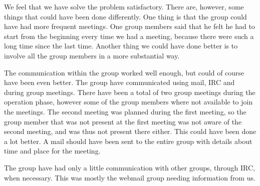 
We feel that we have solve the problem satisfactory. There are, however, some things that could have been done differently. One thing is that the group could have had more frequent meetings. One group members said that he felt he had to start from the beginning every time we had a meeting, because there were such a long time since the last time. Another thing we could have done better is to involve all the group members in a more substantial way. 

The communication within the group worked well enough, but could of course have been even better. The group have communicated using mail, IRC and during group meetings. There have been a total of two group meetings during the operation phase, however some of the group members where not available to join the meetings. The second meeting was planned during the first meeting, so the group member that was not present at the first meeting was not aware of the second meeting, and was thus not present there either. This could have been done a lot better. A mail should have been sent to the entire group with details about time and place for the meeting.

The group have had only a little communication with other groups, through IRC, when necessary. This was mostly the webmail group needing information from us.